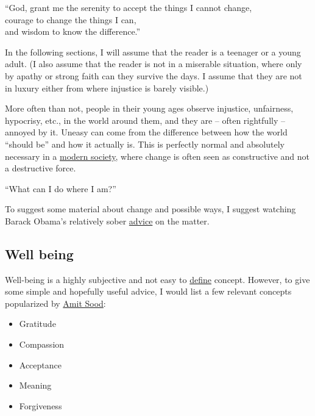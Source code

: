 \documentclass{article}
\begin{document}
\vspace{1cm}
{``God, grant me the serenity to accept the things I cannot change,\\
courage to change the things I can,\\
and wisdom to know the difference.''}
\\[5pt]
\vspace{10pt}

In the following sections, I will assume that the reader is a teenager or a young adult. (I also assume that the reader is not in a miserable situation, where only by apathy or strong faith can they survive the days. I assume that they are not in luxury either from where injustice is barely visible.)

More often than not, people in their young ages observe injustice, unfairness, hypocrisy, etc., in the world around them, and they are -- often rightfully -- annoyed by it. Uneasy can come from the difference between how the world ``should be'' and how it actually is. This is perfectly normal and absolutely necessary in a \href{https://en.wikipedia.org/wiki/Modernity}{modern society}, where change is often seen as constructive and not a destructive force. 

\vspace{1cm}
{``What can I do where I am?''
\\[5pt]
}

To suggest some material about change and possible ways, I suggest watching Barack Obama's relatively sober \href{https://www.youtube.com/watch?v=Ioz96L5xASk}{advice} on the matter.


\subsection{Well being}

Well-being is a highly subjective and not easy to \href{https://plato.stanford.edu/entries/well-being/}{define} concept.
However, to give some simple and hopefully useful advice, I would list a few relevant concepts popularized by \href{https://en.wikipedia.org/wiki/Amit_Sood}{Amit Sood}:

\begin{itemize}
    \item Gratitude
    \item Compassion
    \item Acceptance
    \item Meaning
    \item Forgiveness
\end{itemize}
\end{document}
